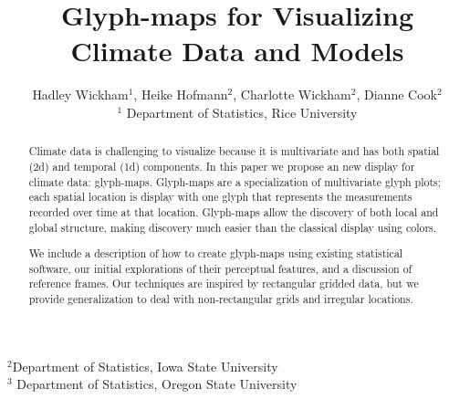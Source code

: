 \documentclass[oneside]{article}
\begin{document}
\title{Glyph-maps for Visualizing Climate Data and Models}
\author{Hadley Wickham$^1$, Heike Hofmann$^2$, Charlotte Wickham$^2$, Dianne Cook$^2$\\
$^1$ Department of Statistics, Rice University}
$^2$Department of Statistics, Iowa State University\\
$^3$ Department of Statistics, Oregon State University\\
\date{}




%
%
\maketitle

\begin{abstract}

Climate data is challenging to visualize because it is multivariate and has both spatial (2d) and temporal (1d) components. In this paper we propose an new display for climate data: glyph-maps. Glyph-maps are a specialization of multivariate glyph plots; each spatial location is display with one glyph that represents the measurements recorded over time at that location. Glyph-maps allow the discovery of both local and global structure, making discovery much easier than the classical display using colors.

We include a description of how to create glyph-maps using existing statistical software, our initial explorations of their perceptual features, and a discussion of reference frames. Our techniques are inspired by rectangular gridded data, but we provide generalization to deal with non-rectangular grids and irregular locations.

\end{abstract}
\end{document}

